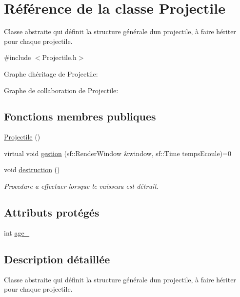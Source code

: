 \hypertarget{class_projectile}{}\section{Référence de la classe Projectile}
\label{class_projectile}


Classe abstraite qui définit la structure générale d\textquotesingle{}un projectile, à faire hériter pour chaque projectile.  




{\ttfamily \#include $<$Projectile.\+h$>$}



Graphe d\textquotesingle{}héritage de Projectile\+:


Graphe de collaboration de Projectile\+:
\subsection*{Fonctions membres publiques}
\begin{DoxyCompactItemize}
\item 
\hyperlink{class_projectile_ac536ed2aad56af866a2078b9a85aa16d}{Projectile} ()
\item 
virtual void \hyperlink{class_projectile_a09e02b793473660fc59a329a4dfea0ec}{gestion} (sf\+::\+Render\+Window \&window, sf\+::\+Time temps\+Ecoule)=0
\item 
void \hyperlink{class_projectile_aac0afd5bf761f0e212d4e1c8a503c86a}{destruction} ()
\begin{DoxyCompactList}\small\item\em Procedure a effectuer lorsque le vaisseau est détruit. \end{DoxyCompactList}\end{DoxyCompactItemize}
\subsection*{Attributs protégés}
\begin{DoxyCompactItemize}
\item 
int \hyperlink{class_projectile_a1f0a231e002d4796c32ccfeb36c887b1}{age\+\_\+}
\end{DoxyCompactItemize}


\subsection{Description détaillée}
Classe abstraite qui définit la structure générale d\textquotesingle{}un projectile, à faire hériter pour chaque projectile. 

